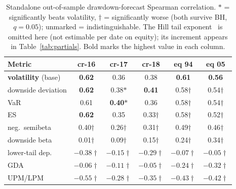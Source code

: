 \documentclass[sigconf,anonymous,nonacm]{acmart}
\begin{document}
\begin{table}[t]
\centering
\caption{Standalone out-of-sample drawdown-forecast Spearman correlation.
$\ast$ = significantly beats volatility, $\dagger$ = significantly worse (both
survive BH, $q=0.05$); unmarked = indistinguishable. The Hill tail
exponent~\cite{kellyjiang2014} is omitted here (not estimable per date on
equity); its increment appears in Table~\ref{tab:partials}. Bold marks the highest value in each column.}
\label{tab:h2h}
\small
\begin{tabular}{lccccc}
\toprule
Metric & cr-16 & cr-17 & cr-18 & eq 94 & eq 05 \\
\midrule
\textbf{volatility} (base) & \textbf{0.62} & 0.36 & 0.38 & \textbf{0.61} & \textbf{0.56} \\
downside deviation & \textbf{0.62} & 0.38$\ast$ & \textbf{0.41} & 0.58$\dagger$ & 0.54$\dagger$ \\
VaR & 0.61 & \textbf{0.40}$\ast$ & 0.36 & 0.58$\dagger$ & 0.54$\dagger$ \\
ES~\cite{rockafellar2000} & \textbf{0.62} & 0.35 & 0.33$\dagger$ & 0.58$\dagger$ & 0.52$\dagger$ \\
neg.\ semibeta~\cite{bpq2022} & 0.40$\dagger$ & 0.26$\dagger$ & 0.31$\dagger$ & 0.49$\dagger$ & 0.46$\dagger$ \\
downside beta~\cite{ang2006} & 0.01$\dagger$ & 0.09$\dagger$ & 0.15$\dagger$ & 0.24$\dagger$ & 0.34$\dagger$ \\
lower-tail dep.~\cite{chabiyo2018} & $-0.38\dagger$ & $-0.15\dagger$ & $-0.29\dagger$ & $-0.07\dagger$ & $-0.05\dagger$ \\
GDA~\cite{faragotedongap2018} & $-0.06\dagger$ & $-0.11\dagger$ & $-0.05\dagger$ & $-0.24\dagger$ & $-0.32\dagger$ \\
UPM/LPM~\cite{violenawrocki2016} & $-0.55\dagger$ & $-0.28\dagger$ & $-0.35\dagger$ & $-0.43\dagger$ & $-0.42\dagger$ \\
\bottomrule
\end{tabular}
\end{table}

\end{document}
